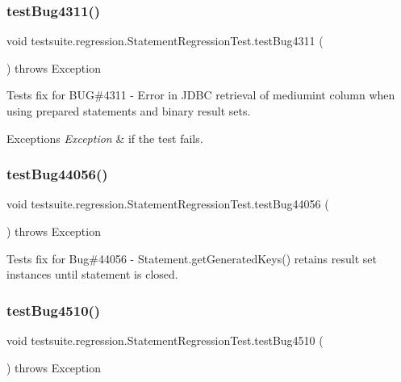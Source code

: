 \subsubsection{\texorpdfstring{test\+Bug4311()}{testBug4311()}}
{\footnotesize\ttfamily void testsuite.\+regression.\+Statement\+Regression\+Test.\+test\+Bug4311 (\begin{DoxyParamCaption}{ }\end{DoxyParamCaption}) throws Exception}

Tests fix for B\+UG\#4311 -\/ Error in J\+D\+BC retrieval of mediumint column when using prepared statements and binary result sets.


\begin{DoxyExceptions}{Exceptions}
{\em Exception} & if the test fails. \\
\hline
\end{DoxyExceptions}
\mbox{\label{classtestsuite_1_1regression_1_1_statement_regression_test_a51bfb33bc4a3aa413859fd7fef39f1c2}} 
\subsubsection{\texorpdfstring{test\+Bug44056()}{testBug44056()}}
{\footnotesize\ttfamily void testsuite.\+regression.\+Statement\+Regression\+Test.\+test\+Bug44056 (\begin{DoxyParamCaption}{ }\end{DoxyParamCaption}) throws Exception}

Tests fix for Bug\#44056 -\/ Statement.\+get\+Generated\+Keys() retains result set instances until statement is closed. \mbox{\label{classtestsuite_1_1regression_1_1_statement_regression_test_aebabf4bfb1e29cff3d9e239fbead766f}} 
\subsubsection{\texorpdfstring{test\+Bug4510()}{testBug4510()}}
{\footnotesize\ttfamily void testsuite.\+regression.\+Statement\+Regression\+Test.\+test\+Bug4510 (\begin{DoxyParamCaption}{ }\end{DoxyParamCaption}) throws Exception}

